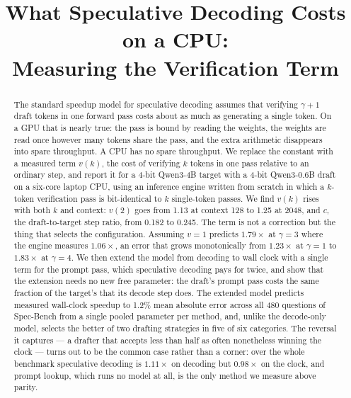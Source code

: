 \documentclass[conference]{IEEEtran}
\begin{document}
\title{What Speculative Decoding Costs on a CPU:\\Measuring the Verification Term}

\author{}

\maketitle

\begin{abstract}
The standard speedup model for speculative decoding assumes that verifying $\gamma+1$ draft tokens in
one forward pass costs about as much as generating a single token. On a GPU that is nearly true: the
pass is bound by reading the weights, the weights are read once however many tokens share the pass,
and the extra arithmetic disappears into spare throughput. A CPU has no spare throughput. We replace
the constant with a measured term $v(k)$, the cost of verifying $k$ tokens in one pass relative to an
ordinary step, and report it for a 4-bit Qwen3-4B target with a 4-bit Qwen3-0.6B draft on a six-core
laptop CPU, using an inference engine written from scratch in which a $k$-token verification pass is
bit-identical to $k$ single-token passes. We find $v(k)$ rises with both $k$ and context: $v(2)$ goes
from 1.13 at context 128 to 1.25 at 2048, and $c$, the draft-to-target step ratio, from 0.182 to
0.245. The term is not a correction but the thing that selects the configuration. Assuming $v=1$
predicts $1.79\times$ at $\gamma=3$ where the engine measures $1.06\times$, an error that grows
monotonically from $1.23\times$ at $\gamma=1$ to $1.83\times$ at $\gamma=4$. We then extend the model
from decoding to wall clock with a single term for the prompt pass, which speculative decoding pays
for twice, and show that the extension needs no new free parameter: the draft's prompt pass costs the
same fraction of the target's that its decode step does. The extended model predicts measured
wall-clock speedup to 1.2\% mean absolute error across all 480 questions of Spec-Bench from a
single pooled parameter per method, and, unlike the decode-only model, selects the better of two
drafting strategies in five of six categories. The reversal it captures --- a drafter that accepts
less than half as often nonetheless winning the clock --- turns out to be the common case rather
than a corner: over the whole benchmark speculative decoding is $1.11\times$ on decoding but
$0.98\times$ on the clock, and prompt lookup, which runs no model at all, is the only method we
measure above parity.
\end{abstract}
\end{document}
